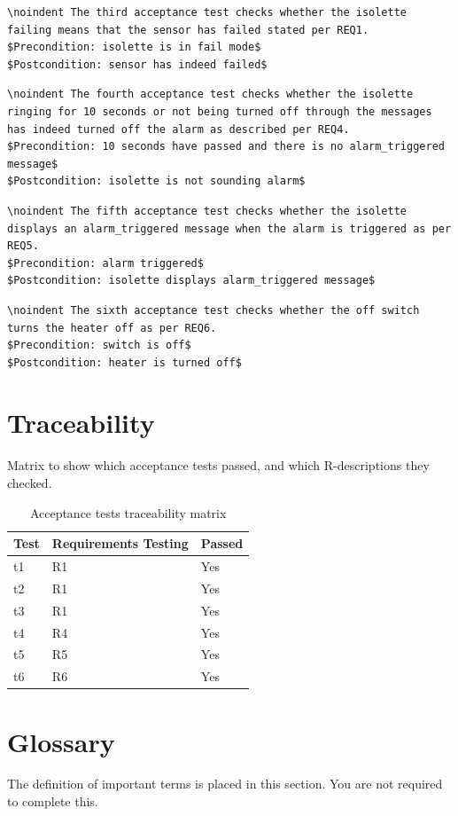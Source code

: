 \documentclass[fontsize=12pt,paper=letter,twoside]{scrartcl}
\begin{document}
\begin{verbatim}
\noindent The third acceptance test checks whether the isolette failing means that the sensor has failed stated per REQ1.
$Precondition: isolette is in fail mode$
$Postcondition: sensor has indeed failed$
\end{verbatim}

\begin{verbatim}
\noindent The fourth acceptance test checks whether the isolette ringing for 10 seconds or not being turned off through the messages has indeed turned off the alarm as described per REQ4.
$Precondition: 10 seconds have passed and there is no alarm_triggered message$
$Postcondition: isolette is not sounding alarm$
\end{verbatim}

\begin{verbatim}
\noindent The fifth acceptance test checks whether the isolette displays an alarm_triggered message when the alarm is triggered as per REQ5.
$Precondition: alarm triggered$
$Postcondition: isolette displays alarm_triggered message$
\end{verbatim}

\begin{verbatim}
\noindent The sixth acceptance test checks whether the off switch turns the heater off as per REQ6.
$Precondition: switch is off$
$Postcondition: heater is turned off$
\end{verbatim}

\section{Traceability}
Matrix to show which acceptance tests passed, and which R-descriptions they checked.

\begin{table}[htb]
\centering
\label{my-label}
\begin{tabular}{|l|l|l|}
\hline
Test & Requirements Testing & Passed \\ \hline
t1   & R1                   & Yes    \\ \hline
t2   & R1                   & Yes    \\ \hline
t3   & R1                   & Yes    \\ \hline
t4   & R4                   & Yes    \\ \hline
t5   & R5                   & Yes    \\ \hline
t6   & R6                   & Yes    \\ \hline
\end{tabular}
\caption{Acceptance tests traceability matrix}
\end{table}

\section{Glossary}
The definition of important terms is placed in this section. You are not required to complete this.



\end{document}
